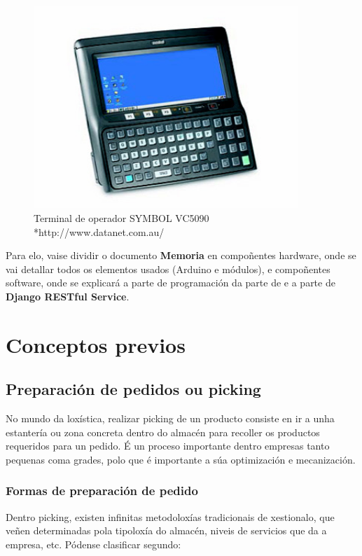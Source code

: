 \documentclass[11pt,twoside]{book}
\begin{document}
\begin{figure}[H]
	\begin{center}
		\includegraphics[width=10cm]{images/symbol_VC5090.jpg}
	\end{center}
	\caption{Terminal de operador SYMBOL VC5090 *http://www.datanet.com.au/}
	\label{fig:IoT}
\end{figure}

Para elo, vaise dividir o documento \textbf{Memoria} en compoñentes hardware, onde se vai detallar todos os elementos usados (Arduino e módulos), e compoñentes software, onde se explicará a parte de programación da parte de  e a parte de \textbf{Django RESTful Service}.

\chapter{Conceptos previos}

\section{Preparación de pedidos ou picking}

No mundo da loxística, realizar picking de un producto consiste en ir a unha estantería ou zona concreta dentro do almacén para recoller os productos requeridos para un pedido. É un proceso importante dentro empresas tanto pequenas coma grades, polo que é importante a súa optimización e mecanización.

\subsection{Formas de preparación de pedido}
Dentro picking, existen infinitas metodoloxías tradicionais de xestionalo, que veñen determinadas pola tipoloxía do almacén, niveis de servicios que da a empresa, etc. 
Pódense clasificar segundo:
\end{document}
